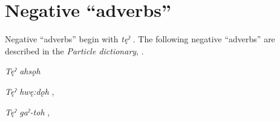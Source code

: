 \section{Negative “adverbs”} \label{ch:Negative ‘adverbs’}
Negative “adverbs” begin with \textit{tęˀ} . The following negative “adverbs” are described in the \textit{Particle dictionary}, .

\begin{CayugaRelated}
    \item \textit{Tęˀ ahsǫh} 

\item{} \textit{Tęˀ hwę:dǫh} , 

\item{} \textit{Tęˀ gaˀ-toh} , 
\end{CayugaRelated}


